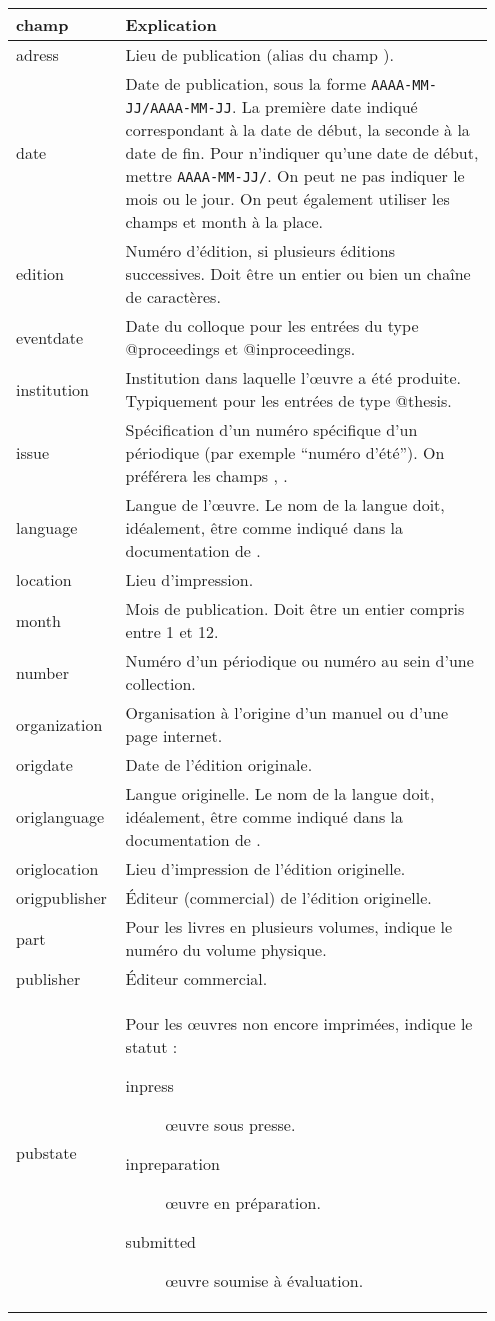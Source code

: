 \begin{longtable}{p{0.2\linewidth}p{0.75\linewidth}}
	champ 		& Explication \\
	\endhead
	adress			& Lieu de publication (alias du champ \champ{location}).	\\
	date			& Date de publication, sous la forme \verb|AAAA-MM-JJ/AAAA-MM-JJ|. La première date indiqué correspondant à la date de début, la seconde à la date de fin. Pour n'indiquer qu'une date de début, mettre \verb|AAAA-MM-JJ/|. On peut ne pas indiquer le mois ou le jour. On peut également utiliser les champs \champ{year} et {month} à la place. \\
	edition		& Numéro d'édition, si plusieurs éditions successives. Doit être un entier ou bien un chaîne de caractères.				\\
	eventdate		& Date du colloque pour les entrées du type @proceedings et @inproceedings. \\
	institution		& Institution dans laquelle l'œuvre a été produite. Typiquement pour les entrées de type @thesis. \\
	issue			& Spécification d'un numéro spécifique d'un périodique (par exemple \enquote{numéro d'été}). On préférera les champs \champ{year}, \champ{month}.	\\
	language		& Langue de l'œuvre. Le nom de la langue doit, idéalement, être comme indiqué dans la documentation de \package{polyglossia}.					\\
	location		& Lieu d'impression.  					\\
	month			& Mois de publication. Doit être un entier compris entre 1 et 12. \\
	number		& Numéro d'un périodique ou numéro au sein d'une collection. 	\\
	organization		& Organisation à l'origine d'un manuel ou d'une page internet.	\\
	origdate		& Date de l'édition originale.						\\
	origlanguage	& Langue originelle. Le nom de la langue doit, idéalement, être comme indiqué dans la documentation de \package{polyglossia}. \\
	origlocation		& Lieu d'impression de l'édition	originelle.		\\
	origpublisher	& Éditeur (commercial) de l'édition originelle.		\\
	part			& Pour les livres en plusieurs volumes, indique le numéro du volume physique. \\
	publisher		& Éditeur commercial.					\\
	pubstate		& Pour les œuvres non encore imprimées, indique le statut :
					\begin{description}
						\item[inpress]œuvre sous presse.
						\item[inpreparation]œuvre en préparation.
						\item[submitted]œuvre soumise à évaluation.
					\end{description}
					

\end{longtable}
